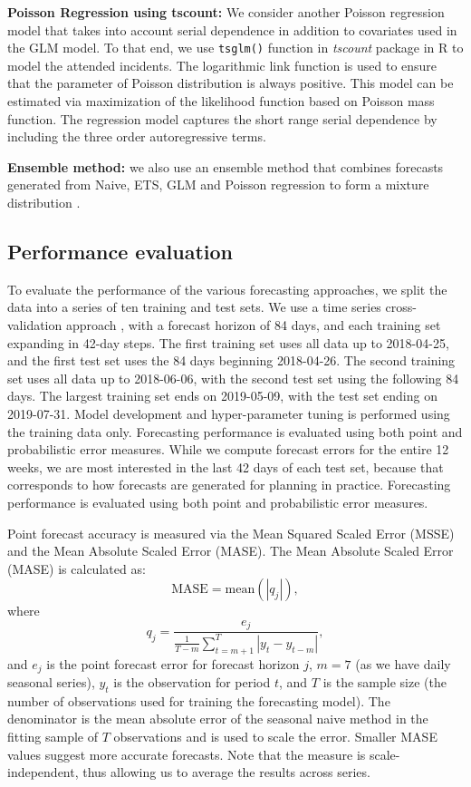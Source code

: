 \documentclass[
  authoryear,
  preprint,
  3p]{elsarticle}
\begin{document}
\textbf{Poisson Regression using tscount:} We consider another Poisson
regression model that takes into account serial dependence in addition
to covariates used in the GLM model. To that end, we use
\texttt{tsglm()} function in \emph{tscount} package in R to model the
attended incidents. The logarithmic link function is used to ensure that
the parameter of Poisson distribution is always positive. This model can
be estimated via maximization of the likelihood function based on
Poisson mass function. The regression model captures the short range
serial dependence by including the three order autoregressive terms.

\textbf{Ensemble method:} we also use an ensemble method that combines
forecasts generated from Naive, ETS, GLM and Poisson regression to form
a mixture distribution \citep{combinations}.

\hypertarget{performance-evaluation}{%
\subsection{Performance evaluation}\label{performance-evaluation}}

To evaluate the performance of the various forecasting approaches, we
split the data into a series of ten training and test sets. We use a
time series cross-validation approach \citep{hyndman2021forecasting},
with a forecast horizon of 84 days, and each training set expanding in
42-day steps. The first training set uses all data up to 2018-04-25, and
the first test set uses the 84 days beginning 2018-04-26. The second
training set uses all data up to 2018-06-06, with the second test set
using the following 84 days. The largest training set ends on
2019-05-09, with the test set ending on 2019-07-31. Model development
and hyper-parameter tuning is performed using the training data only.
Forecasting performance is evaluated using both point and probabilistic
error measures. While we compute forecast errors for the entire 12
weeks, we are most interested in the last 42 days of each test set,
because that corresponds to how forecasts are generated for planning in
practice. Forecasting performance is evaluated using both point and
probabilistic error measures.

Point forecast accuracy is measured via the Mean Squared Scaled Error
(MSSE) and the Mean Absolute Scaled Error (MASE). The Mean Absolute
Scaled Error (MASE) \citep{HK06} is calculated as: \[
  \text{MASE} = \text{mean}(|q_{j}|),
\] where \[
  q_{j} = \frac{ e_{j}}
    {\displaystyle\frac{1}{T-m}\sum_{t=m+1}^T |y_{t}-y_{t-m}|},
\] and \(e_{j}\) is the point forecast error for forecast horizon \(j\),
\(m = 7\) (as we have daily seasonal series), \(y_t\) is the observation
for period \(t\), and \(T\) is the sample size (the number of
observations used for training the forecasting model). The denominator
is the mean absolute error of the seasonal naive method in the fitting
sample of \(T\) observations and is used to scale the error. Smaller
MASE values suggest more accurate forecasts. Note that the measure is
scale-independent, thus allowing us to average the results across
series.
\end{document}
